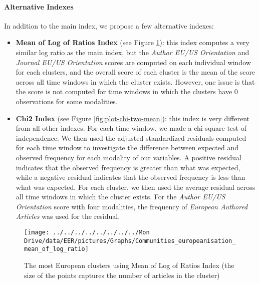 \documentclass[
  12pt,
  onecolumn]{article}
\providecommand{\tightlist}{%
  \setlength{\itemsep}{0pt}\setlength{\parskip}{0pt}}
\begin{document}
\hypertarget{alt-index}{%
\paragraph*{Alternative Indexes}\label{alt-index}}

In addition to the main index, we propose a few alternative indexes:

\begin{itemize}
\tightlist
\item
  \textbf{Mean of Log of Ratios Index} (see Figure \ref{fig:plot-mean-log-ratios}): this index computes a very similar log ratio as the main index, but the \emph{Author EU/US Orientation} and \emph{Journal EU/US Orientation} scores are computed on each individual window for each clusters, and the overall score of each cluster is the mean of the score across all time windows in which the cluster exists. However, one issue is that the score is not computed for time windows in which the clusters have 0 observations for some modalities.
\item
  \textbf{Chi2 Index} (see Figure \ref{fig:plot-chi-two-mean}): this index is very different from all other indexes. For each time window, we made a chi-square test of independence. We then used the adjusted standardized residuals computed for each time window to investigate the difference between expected and observed frequency for each modality of our variables. A positive residual indicates that the observed frequency is greater than what was expected, while a negative residual indicates that the observed frequency is less than what was expected. For each cluster, we then used the average residual across all time windows in which the cluster exists. For the \emph{Author EU/US Orientation} score with four modalities, the frequency of \emph{European Authored Articles} was used for the residual.
\end{itemize}

\begin{figure}[H]

{\centering \texttt{[image: ../../../../../../../../Mon Drive/data/EER/pictures/Graphs/Communities\_europeanisation\_mean\_of\_log\_ratio]} 

}

\caption{The most European clusters using Mean of Log of Ratios Index (the size of the points captures the number of articles in the cluster)}\label{fig:plot-mean-log-ratios}
\end{figure}
\end{document}
